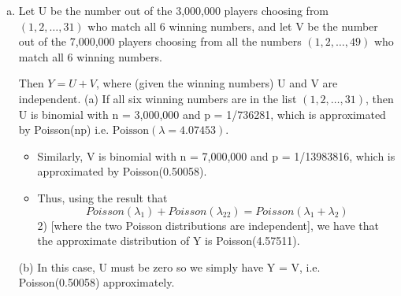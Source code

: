 \documentclass[a4paper,12pt]{article}
\begin{document}
\begin{enumerate}[(a)]
\[ P(\mbox{Winning set} \in \{1,2,\ldots 31\} = \frac{ 736281}{13983816} =  0.05265\]


\begin{framed}
(iv) Suppose now that 3,000,000 lottery players choose their six numbers, at
random and without replacement, from the list 1, 2, 3, …, 31, whilst 7,000,000
players choose their six numbers, at random and without replacement, from the
list 1, 2, 3, …, 49. Let Y denote the total number of players who match the six
winning numbers. Write down the (approximate) distribution of Y
(a) when all six winning numbers are in the list 1, 2, 3, …, 31,
(b) when at least one winning number is not in this list.

\end{framed}

\item  Let U be the number out of the 3,000,000 players choosing from $(1, 2, \ldots, 31)$
who match all 6 winning numbers, and let V be the number out of the 7,000,000
players choosing from all the numbers $(1, 2,\ldots, 49)$ who match all 6 winning
numbers.


Then $Y = U + V$, where (given the winning numbers) U and V are independent.
(a) If all six winning numbers are in the list $(1, 2, \ldots, 31)$, then U is
binomial with n = 3,000,000 and p = 1/736281, which is approximated by
Poisson(np) i.e. $\mbox{Poisson} (\lambda = 4.07453)$.
\begin{itemize}
\item Similarly, V is binomial with n = 7,000,000 and p = 1/13983816, which is
approximated by Poisson(0.50058).



\item Thus, using the result that 
\[Poisson( \lambda_1) + Poisson( \lambda_22) = Poisson( \lambda_1 + \lambda_2)\]
2)
[where the two Poisson distributions are independent], we have that the
approximate distribution of Y is Poisson(4.57511).
\end{itemize}
(b) In this case, U must be zero so we simply have Y = V, i.e.
Poisson(0.50058) approximately.
\end{enumerate}
\end{document}
